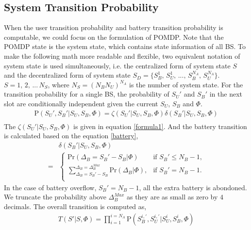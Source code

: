 \documentclass[conference]{IEEEtran}
\begin{document}
\subsection{System Transition Probability}
When the user transition probability and battery transition probability is computable,
we could focus on the formulation of POMDP.
Note that the POMDP state is the system state, which contains state information of all BS.
To make the following math more readable and flexible,
two equivalent notation of system state is used simultaneously, i.e.
the centralized form of system state \(S\) and
the decentralized form of system state \(S_D = \{S_B^1,\,S_U^1,\,...,\,S_B^{N_A},\,S_U^{N_A}\}\).
\(S = 1,\,2,\, ... \,N_S\), where \(N_S = \left(N_BN_U\right)^{N_A}\) is the number of system state.
For the transition probability for a single BS,
the probability of \(S_U'\) and \(S_B'\) in the next slot are conditionally independent
given the current \(S_U\), \(S_B\) and \(\Phi\).
\begin{equation}
\begin{aligned}
	\mbox{P}\left(S_U',S_B'|S_U,S_B,\Phi\right) =
	\zeta\left(S_U'|S_U, S_B, \Phi\right) \delta\left(S_B'|S_U, S_B, \Phi\right)\\
\end{aligned}
\end{equation}
The \(\zeta\left(S_U'|S_U, S_B, \Phi\right)\) is given in equation \eqref{formula1}.
And the battery transition is calculated based on the equation \eqref{battery},
\begin{align}
	&\delta\left(S_B'|S_U, S_B, \Phi\right)\nonumber\\
	= &
	\begin{cases}
		\mbox{Pr}\left(\Delta_B = S_B' - S_B|\Phi \right) &\mbox{if $S_B' \le N_B - 1$,}\\
		\sum_{\Delta_B = S_B' - S_B}^{\Delta_B = \Delta_B^{Max}}\mbox{Pr}\left(\Delta_B|\Phi\right),
		&\mbox{if $S_B' = N_B - 1$.}\\
\end{cases}
\end{align}
In the case of battery overflow, \(S_B'=N_B - 1\), all the extra battery is abondoned.
We truncate the probability above \(\Delta_B^{Max}\) as they are as small as zero by \(4\) decimals.
The overall transition is computed as,
\begin{align}\label{transition}
	T\left(S'|S,\Phi\right) = \prod_{i = 1}^{i = N_A}\mbox{P}\left(S_B^{i,'}, S_U^{i,'}|S_U^i, S_B^i, \Phi\right)
\end{align}
\end{document}
